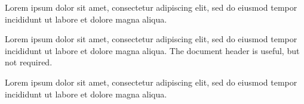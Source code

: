 \begin{example}
Lorem ipsum dolor sit amet, consectetur adipiscing elit, sed do eiusmod tempor
incididunt ut labore et dolore magna aliqua.
\end{example}

\begin{example}
Lorem ipsum dolor sit amet, consectetur adipiscing elit, sed do eiusmod tempor
incididunt ut labore et dolore magna aliqua.
The document header is useful, but not required.
\end{example}

\begin{example}
Lorem ipsum dolor sit amet, consectetur adipiscing elit, sed do eiusmod tempor
incididunt ut labore et dolore magna aliqua.
\end{example}
